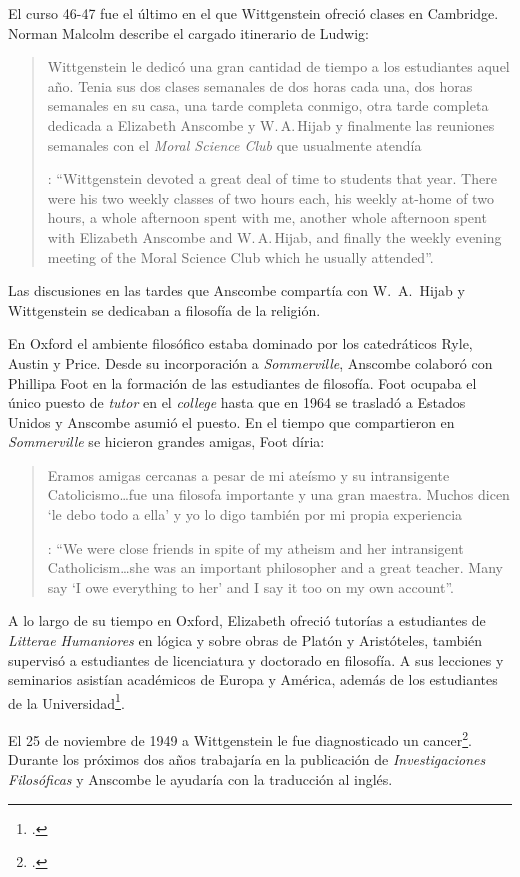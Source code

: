 El curso 46-47 fue el último en el que Wittgenstein ofreció clases en Cambridge. Norman Malcolm describe el cargado itinerario de Ludwig: \blockquote[{\Cite[358]{KlaggeNordman2003pubnpriv}}: \enquote{Wittgenstein devoted a great deal of time to students that year. There were his two weekly classes of two hours each, his weekly at-home of two hours, a whole afternoon spent with me, another whole afternoon spent with Elizabeth Anscombe and W.\,A.\,Hijab, and finally the weekly evening meeting of the Moral Science Club which he usually attended}.]{Wittgenstein le dedicó una gran cantidad de tiempo a los estudiantes aquel año. Tenia sus dos clases semanales de dos horas cada una, dos horas semanales en su casa, una tarde completa conmigo, otra tarde completa dedicada a Elizabeth Anscombe y W.\,A.\,Hijab y finalmente las reuniones semanales con el \emph{Moral Science Club} que usualmente atendía}. Las discusiones en las tardes que Anscombe compartía con W.~A.~Hijab y Wittgenstein se dedicaban a filosofía de la religión.

En Oxford el ambiente filosófico estaba dominado por los catedráticos Ryle, Austin y Price. Desde su incorporación a \emph{Sommerville}, Anscombe colaboró con Phillipa Foot en la formación de las estudiantes de filosofía. Foot ocupaba el único puesto de \emph{tutor} en el \emph{college} hasta que en 1964 se trasladó a Estados Unidos y Anscombe asumió el puesto. En el tiempo que compartieron en \emph{Sommerville} se hicieron grandes amigas, Foot díria: \blockquote[{\Cite[35]{teichman2002fellows}}: \enquote{We were close friends in spite of my atheism and her intransigent Catholicism\ldots she was an important philosopher and a great teacher. Many say `I owe everything to her' and I say it too on my own account}.]{Eramos amigas cercanas a pesar de mi ateísmo y su intransigente Catolicismo\ldots fue una filosofa importante y una gran maestra. Muchos dicen `le debo todo a ella' y yo lo digo también por mi propia experiencia}.

A lo largo de su tiempo en Oxford, Elizabeth ofreció tutorías a estudiantes de \emph{Litterae Humaniores} en lógica y sobre obras de Platón y Aristóteles, también supervisó a estudiantes de licenciatura y doctorado en filosofía. A sus lecciones y seminarios asistían académicos de Europa y América, además de los estudiantes de la Universidad\footcite[Cf.][32]{teichman2002fellows}.

El 25 de noviembre de 1949 a Wittgenstein le fue diagnosticado un cancer\footcite[Cf.][559]{monk1991duty}. Durante los próximos dos años trabajaría en la publicación de \emph{Investigaciones Filosóficas} y Anscombe le ayudaría con la traducción al inglés.

